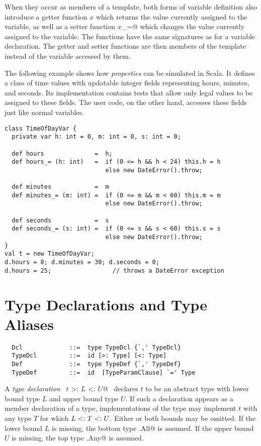 \documentclass[a4paper,12pt,twoside,titlepage]{book}
\begin{document}
When they occur as members of a template, both forms of variable
definition also introduce a getter function $x$ which returns the
value currently assigned to the variable, as well as a setter function
\lstinline@$x$_=@ which changes the value currently assigned to the variable.
The functions have the same signatures as for a variable declaration.
The getter and setter functions are then members of the template
instead of the variable accessed by them.

\example The following example shows how {\em properties} can be
simulated in Scala. It defines a class  of time
values with updatable integer fields representing hours, minutes, and
seconds. Its implementation contains tests that allow only legal
values to be assigned to these fields. The user code, on the other
hand, accesses these fields just like normal variables.

\begin{lstlisting}
class TimeOfDayVar {
  private var h: int = 0, m: int = 0, s: int = 0;

  def hours              =  h;
  def hours_= (h: int)   =  if (0 <= h && h < 24) this.h = h 
                            else new DateError().throw;

  def minutes            =  m
  def minutes_= (m: int) =  if (0 <= m && m < 60) this.m = m
                            else new DateError().throw;

  def seconds            =  s
  def seconds_= (s: int) =  if (0 <= s && s < 60) this.s = s
                            else new DateError().throw;
}
val t = new TimeOfDayVar;
d.hours = 8; d.minutes = 30; d.seconds = 0;
d.hours = 25;                 // throws a DateError exception
\end{lstlisting}

\section{Type Declarations and Type Aliases}
\label{sec:typedcl}
\label{sec:typealias}

\syntax\begin{lstlisting}
  Dcl             ::=  type TypeDcl {`,' TypeDcl}
  TypeDcl         ::=  id [>: Type] [<: Type]
  Def             ::=  type TypeDef {`,' TypeDef}
  TypeDef         ::=  id  [TypeParamClause] `=' Type
\end{lstlisting}

A {\em type declaration} ~\lstinline@type $t$ >: $L$ <: $U$@~ declares $t$ to
be an abstract type with lower bound type $L$ and upper bound
type $U$.  If such a declaration appears as a member declaration
of a type, implementations of the type may implement $t$ with any
type $T$ for which $L <: T <: U$. Either or both bounds may
be omitted.  If the lower bound $L$ is missing, the bottom type
\lstinline@scala.All@ is assumed.  If the upper bound $U$ is missing,
the top type \lstinline@scala.Any@ is assumed.
\end{document}

